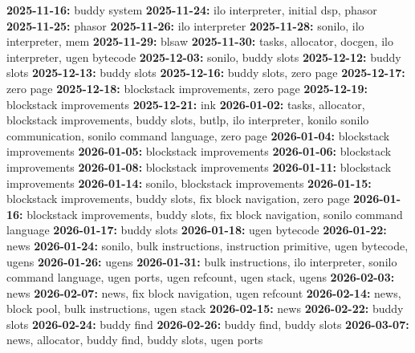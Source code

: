 {\noindent \bf 2025-11-16:} buddy system\smallskip
{\noindent \bf 2025-11-24:} ilo interpreter, initial dsp, phasor\smallskip
{\noindent \bf 2025-11-25:} phasor\smallskip
{\noindent \bf 2025-11-26:} ilo interpreter\smallskip
{\noindent \bf 2025-11-28:} sonilo, ilo interpreter, mem\smallskip
{\noindent \bf 2025-11-29:} blsaw\smallskip
{\noindent \bf 2025-11-30:} tasks, allocator, docgen, ilo interpreter, ugen bytecode\smallskip
{\noindent \bf 2025-12-03:} sonilo, buddy slots\smallskip
{\noindent \bf 2025-12-12:} buddy slots\smallskip
{\noindent \bf 2025-12-13:} buddy slots\smallskip
{\noindent \bf 2025-12-16:} buddy slots, zero page\smallskip
{\noindent \bf 2025-12-17:} zero page\smallskip
{\noindent \bf 2025-12-18:} blockstack improvements, zero page\smallskip
{\noindent \bf 2025-12-19:} blockstack improvements\smallskip
{\noindent \bf 2025-12-21:} ink\smallskip
{\noindent \bf 2026-01-02:} tasks, allocator, blockstack improvements, buddy slots, butlp, ilo interpreter, konilo sonilo communication, sonilo command language, zero page\smallskip
{\noindent \bf 2026-01-04:} blockstack improvements\smallskip
{\noindent \bf 2026-01-05:} blockstack improvements\smallskip
{\noindent \bf 2026-01-06:} blockstack improvements\smallskip
{\noindent \bf 2026-01-08:} blockstack improvements\smallskip
{\noindent \bf 2026-01-11:} blockstack improvements\smallskip
{\noindent \bf 2026-01-14:} sonilo, blockstack improvements\smallskip
{\noindent \bf 2026-01-15:} blockstack improvements, buddy slots, fix block navigation, zero page\smallskip
{\noindent \bf 2026-01-16:} blockstack improvements, buddy slots, fix block navigation, sonilo command language\smallskip
{\noindent \bf 2026-01-17:} buddy slots\smallskip
{\noindent \bf 2026-01-18:} ugen bytecode\smallskip
{\noindent \bf 2026-01-22:} news\smallskip
{\noindent \bf 2026-01-24:} sonilo, bulk instructions, instruction primitive, ugen bytecode, ugens\smallskip
{\noindent \bf 2026-01-26:} ugens\smallskip
{\noindent \bf 2026-01-31:} bulk instructions, ilo interpreter, sonilo command language, ugen ports, ugen refcount, ugen stack, ugens\smallskip
{\noindent \bf 2026-02-03:} news\smallskip
{\noindent \bf 2026-02-07:} news, fix block navigation, ugen refcount\smallskip
{\noindent \bf 2026-02-14:} news, block pool, bulk instructions, ugen stack\smallskip
{\noindent \bf 2026-02-15:} news\smallskip
{\noindent \bf 2026-02-22:} buddy slots\smallskip
{\noindent \bf 2026-02-24:} buddy find\smallskip
{\noindent \bf 2026-02-26:} buddy find, buddy slots\smallskip
{\noindent \bf 2026-03-07:} news, allocator, buddy find, buddy slots, ugen ports\smallskip
